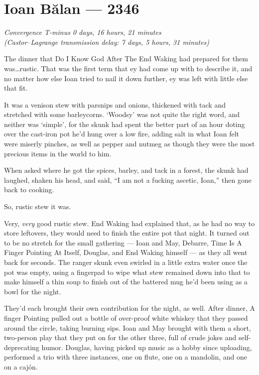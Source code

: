 \hypertarget{ioan-bux103lan-2346}{%
\chapter{Ioan Bălan — 2346}\label{ioan-bux103lan-2346}}

\begin{center}
\emph{Convergence T-minus 0 days, 16 hours, 21 minutes}\\
\emph{(Castor--Lagrange transmission delay: 7 days, 5 hours, 31 minutes)}
\end{center}

\noindent The dinner that Do I Know God After The End Waking had prepared for them was\ldots rustic. That was the first term that ey had come up with to describe it, and no matter how else Ioan tried to nail it down further, ey was left with little else that fit.

It was a venison stew with parsnips and onions, thickened with tack and stretched with some barleycorns. `Woodsy' was not quite the right word, and neither was `simple', for the skunk had spent the better part of an hour doting over the cast-iron pot he'd hung over a low fire, adding salt in what Ioan felt were miserly pinches, as well as pepper and nutmeg as though they were the most precious items in the world to him.

When asked where he got the spices, barley, and tack in a forest, the skunk had laughed, shaken his head, and said, ``I am not a fucking ascetic, Ioan,'' then gone back to cooking.

So, rustic stew it was.

Very, \emph{very} good rustic stew. End Waking had explained that, as he had no way to store leftovers, they would need to finish the entire pot that night. It turned out to be no stretch for the small gathering — Ioan and May, Debarre, Time Is A Finger Pointing At Itself, Douglas, and End Waking himself — as they all went back for seconds. The ranger skunk even swirled in a little extra water once the pot was empty, using a fingerpad to wipe what stew remained down into that to make himself a thin soup to finish out of the battered mug he'd been using as a bowl for the night.

They'd each brought their own contribution for the night, as well. After dinner, A finger Pointing pulled out a bottle of over-proof white whiskey that they passed around the circle, taking burning sips. Ioan and May brought with them a short, two-person play that they put on for the other three, full of crude jokes and self-deprecating humor. Douglas, having picked up music as a hobby since uploading, performed a trio with three instances, one on flute, one on a mandolin, and one on a cajón.

